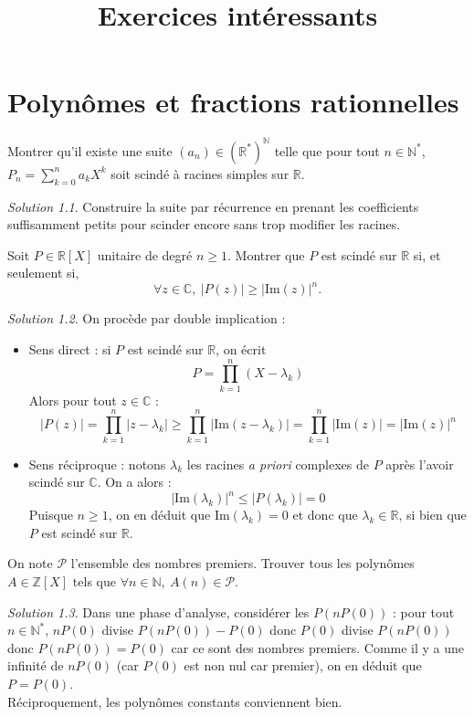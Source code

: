 \documentclass[french]{book}
\title{Exercices intéressants}
\newcommand{\N}{\mathbb{N}}
\newcommand{\Z}{\mathbb{Z}}
\newcommand{\R}{\mathbb{R}}
\newcommand{\C}{\mathbb{C}}
\newcommand{\st}{^*}
\newcommand{\im}{\text{Im}}
\theoremstyle{definition}
\theoremstyle{remark}
\newtheorem*{sol}{Solution}
\begin{document}
\chapter{Polynômes et fractions rationnelles}

\begin{exo}[0]{}
	Montrer qu'il existe une suite $(a_n)\in(\R\st)^\N$ telle que pour tout $n\in\N\st$, $P_n=\displaystyle\sum_{k=0}^{n}a_kX^k$ soit scindé à racines simples sur $\R$.
\end{exo}
\begin{sol}
	Construire la suite par récurrence en prenant les coefficients suffisamment petits pour scinder encore sans trop modifier les racines.
\end{sol}

\begin{exo}[1]{}
	Soit $P\in\R[X]$ unitaire de degré $n\geqslant1$. Montrer que $P$ est scindé sur $\R$ si, et seulement si, $$\forall z\in\C,\ \lvert P(z)\rvert\geqslant\lvert\im(z)\rvert^n.$$
\end{exo}
\begin{sol}
	On procède par double implication :
	\begin{itemize}
		\item Sens direct : si $P$ est scindé sur $\R$, on écrit $$P=\prod_{k=1}^{n}(X-\lambda_k)$$ Alors pour tout $z\in\C$ : $$\lvert P(z)\rvert=\prod_{k=1}^{n}\lvert z-\lambda_k\rvert \geqslant \prod_{k=1}^{n}\lvert\im(z-\lambda_k)\rvert=\prod_{k=1}^{n}\lvert\im(z)\rvert=\lvert\im(z)\rvert ^n$$
		\item Sens réciproque : notons $\lambda_k$ les racines \textit{a priori} complexes de $P$ après l'avoir scindé sur $\C$. On a alors : $$\lvert\im(\lambda_k)\rvert^n\leqslant\lvert P(\lambda_k)\rvert=0$$ Puisque $n\geqslant1$, on en déduit que $\im(\lambda_k)=0$ et donc que $\lambda_k\in\R$, si bien que $P$ est scindé sur $\R$.
	\end{itemize}
\end{sol}

\begin{exo}[1]{}
	On note $\mathcal{P}$ l'ensemble des nombres premiers. Trouver tous les polynômes $A \in \Z[X]$ tels que $\forall n \in \N, \ A(n) \in \mathcal{P}$.
\end{exo}
\begin{sol}
	Dans une phase d'analyse, considérer les $P(nP(0))$ : pour tout $n\in\N\st$, $nP(0)$ divise $P(nP(0))-P(0)$ donc $P(0)$ divise $P(nP(0))$ donc $P(nP(0))=P(0)$ car ce sont des nombres premiers. Comme il y a une infinité de $nP(0)$ (car $P(0)$ est non nul car premier), on en déduit que $P=P(0)$. \\
	Réciproquement, les polynômes constants conviennent bien.
\end{sol}
\end{document}
